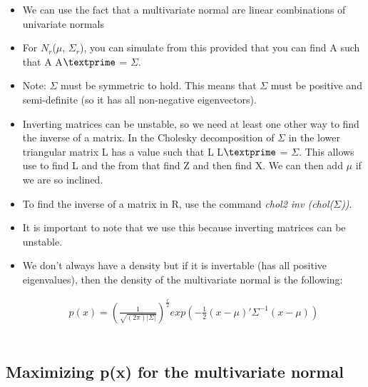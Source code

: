 \documentclass[12pt]{report}
\begin{document}
 \begin{itemize}
 
 \item We can use the fact that a multivariate normal are linear combinations of univariate normals
 
 \item For $N_{r}$($\mu$, $\Sigma_{r}$), you can simulate from this provided that you can find A such that A A$\textprime$ = $\Sigma$.
 
 \item Note: $\Sigma$ must be symmetric to hold. This means that $\Sigma$ must be positive and semi-definite (so it has all non-negative eigenvectors).
 
 \item Inverting matrices can be unstable, so we need at least one other way to find the inverse of a matrix. In the Cholesky decomposition of $\Sigma$ in the lower triangular matrix L has a value such that L L$\textprime$ = $\Sigma$. This allows use to find L and the from that find Z and then find X. We can then add $\mu$ if we are so inclined. 
 
 \item To find the inverse of a matrix in R, use the command \textit{chol2 inv (chol($\Sigma$))}.
 
 \item It is important to note that we use this because inverting matrices can be unstable.
 
 \item We don't always have a density but if it is invertable (has all positive eigenvalues), then the density of the multivariate normal is the following:
 
 \begin{eqnarray}
p(x) = (\frac{1}{\sqrt{(2\pi)|\Sigma|}})^{\frac{r}{2}}  exp(-\frac{1}{2}(x-\mu)'\Sigma^{-1}(x-\mu))
\end{eqnarray}
\\
 
 \end{itemize}

\subsection{Maximizing p(x) for the multivariate normal}
\end{document}
